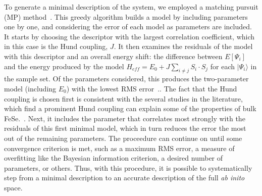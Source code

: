 To generate a minimal description of the system, we employed a matching pursuit (MP) method~\cite{MP_Zhang1993}.
This greedy algorithm builds a model by including parameters one by one, and considering the error of each model as parameters are included.
It starts by choosing the descriptor with the largest correlation coefficient, which in this case is the Hund coupling, $J$.
It then examines the residuals of the model with this descriptor and an overall energy shift: the difference between $E[\Psi_i]$ and the energy produced by the model $H_{eff} = E_0 + J \sum_{i\ne j}S_i \cdot S_j$ for each $|\Psi_i\rangle$ in the sample set.
Of the parameters considered, this produces the two-parameter model (including $E_0$) with the lowest RMS error~\cite{MP_Zhang1993}..
The fact that the Hund coupling is chosen first  is consistent with the several studies in the literature, which find a prominent Hund coupling can explain some of the properties of bulk FeSe.~\cite{demedici_hunds_2011,de_medici_janus-faced_2011,georges_strong_2013,busemeyer_competing_2016}.
Next, it includes the parameter that correlates most strongly with the residuals of this first minimal model, which in turn reduces the error the most out of the remaining parameters. 
The proceedure can continue on until some convergence criterion is met, such as a maximum RMS error, a measure of overfitting like the Bayesian information criterion, a desired number of parameters, or others.
Thus, with this procedure, it is possible to systematically step from a minimal description to an accurate description of the full \textit{ab inito} space.

